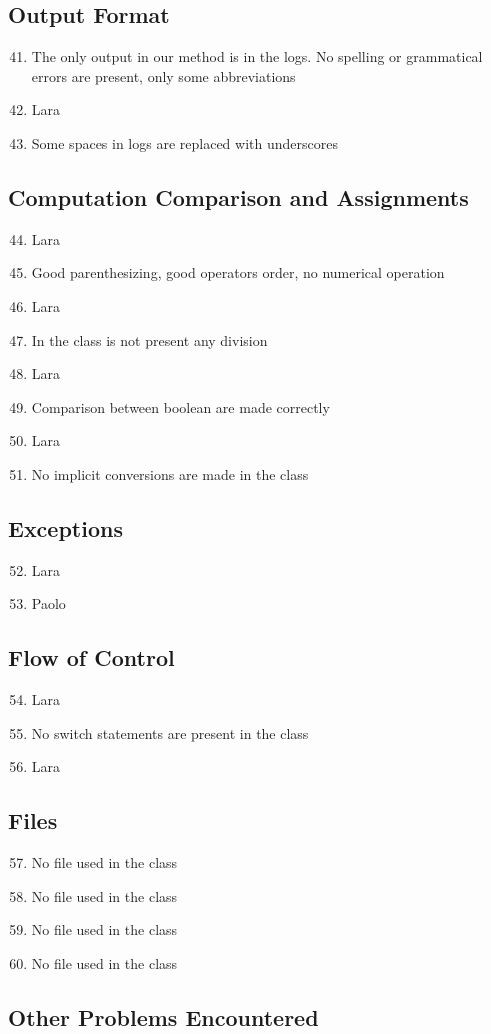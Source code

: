\subsection{Output Format}
\begin{enumerate}
	\setcounter{enumi}{40}
	\item The only output in our method is in the logs. No spelling or grammatical errors are present, only some abbreviations
	\item Lara
	\item Some spaces in logs are replaced with underscores
\end{enumerate}
\subsection{Computation Comparison and Assignments}
\begin{enumerate}
	\setcounter{enumi}{43}
	\item Lara
	\item Good parenthesizing, good operators order, no numerical operation
	\item Lara
	\item In the class is not present any division
	\item Lara
	\item Comparison between boolean are made correctly
	\item Lara
	\item No implicit conversions are made in the class
\end{enumerate}
\subsection{Exceptions}
\begin{enumerate}
	\setcounter{enumi}{51}
	\item Lara
	\item Paolo
\end{enumerate}
\subsection{Flow of Control}
\begin{enumerate}
	\setcounter{enumi}{53}
	\item Lara
	\item No switch statements are present in the class
	\item Lara
\end{enumerate}
\subsection{Files}
\begin{enumerate}
	\setcounter{enumi}{56}
	\item No file used in the class
	\item No file used in the class
	\item No file used in the class
	\item No file used in the class
\end{enumerate}
\subsection{Other Problems Encountered}